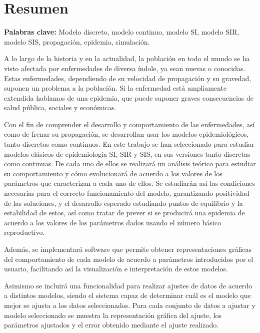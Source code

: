

\chapter*{Resumen}

\textbf{Palabras clave: } Modelo discreto, modelo continuo, modelo SI, modelo SIR, modelo SIS, propagación, epidemia, simulación.

A lo largo de la historia y en la actualidad, la población en todo el mundo se ha visto afectada por enfermedades de diversa índole, ya sean nuevas o conocidas. Estas enfermedades, dependiendo de su velocidad de propagación y su gravedad, suponen un problema a la población. Si la enfermedad está ampliamente extendida hablamos de una epidemia, que puede suponer graves consecuencias de salud pública, sociales y económicas.

Con el fin de comprender el desarrollo y comportamiento de las enfermedades, así como de frenar su propagación, se desarrollan usar los modelos epidemiológicos, tanto discretos como continuos. En este trabajo se han seleccionado para estudiar modelos clásicos de epidemiología SI, SIR y SIS, en sus versiones tanto discretas como continuas. De cada uno de ellos se realizará un análisis teórico para estudiar su comportamiento y cómo evolucionará de acuerdo a los valores de los parámetros que caracterizan a cada uno de ellos. Se estudiarán así las condiciones necesarias para el correcto funcionamiento del modelo, garantizando positividad de las soluciones, y el desarrollo esperado estudiando puntos de equilibrio y la estabilidad de estos, así como tratar de prever si se producirá una epidemia de acuerdo a los valores de los parámetros dados usando el número básico reproductivo.

Además, se implementará software que permite obtener representaciones gráficas del comportamiento de cada modelo de acuerdo a parámetros introducidos por el usuario, facilitando así la visualización e interpretación de estos modelos.

Asimismo se incluirá una funcionalidad para realizar ajustes de datos de acuerdo a distintos modelos, siendo el sistema capaz de determinar cuál es el modelo que mejor se ajusta a los datos seleccionados. Para cada conjunto de datos a ajustar y modelo seleccionado se muestra la representación gráfica del ajuste, los parámetros ajustados y el error obtenido mediante el ajuste realizado.

